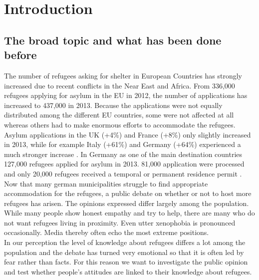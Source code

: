 \section{Introduction}

\subsection{The broad topic and what has been done before}

The number of refugees asking for shelter in European Countries has strongly increased due to recent conflicts in the Near East and Africa.
From 336,000 refugees applying for asylum in the EU in 2012, the number of applications has increased to 437,000 in 2013. Because the applications were not equally distributed among the different EU countries, some were not affected at all whereas others had to make enormous efforts to accommodate the refugees. Asylum applications in the UK (+4\%) and France (+8\%) only slightly increased in 2013, while for example Italy (+61\%) and Germany (+64\%) experienced a much stronger increase \citep{BAMF2014}. In Germany as one of the main destination countries 127,000 refugees applied for asylum in 2013. 81,000 application were processed and only 20,000 refugees received a temporal or permanent residence permit \citep{BAMF2013}.
Now that many german municipalities struggle to find appropriate accommodation for the refugees, a public debate on whether or not to host more refugees has arisen. The opinions expressed differ largely among the population. While many people show honest empathy and try to help, there are many who do not want refugees living in proximity. Even utter xenophobia is pronounced occasionally. Media thereby often echo the most extreme positions.\\
In our perception the level of knowledge about refugees differs a lot among the population and the debate has turned very emotional so that it is often led by fear rather than facts. For this reason we want to investigate the public opinion and test whether people's attitudes are linked to their knowledge about refugees.

